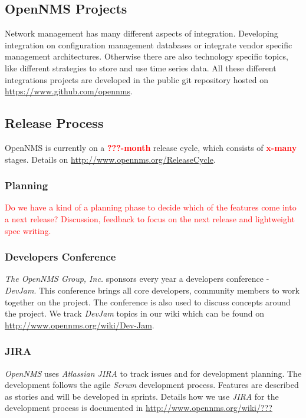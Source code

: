 \subsection{OpenNMS Projects}
Network management has many different aspects of integration. Developing integration on configuration management databases or integrate vendor specific management architectures. Otherwise there are also technology specific topics, like different strategies to store and use time series data. All these different integrations projects are developed in the public git repository hosted on \url{https://www.github.com/opennms}.

\subsection{Release Process}
OpenNMS is currently on a \textbf{\textcolor{red}{???-month}} release cycle, which consists of \textbf{\textcolor{red}{x-many}} stages. Details on \textcolor{red}{\url{http://www.opennms.org/ReleaseCycle}}.

\subsubsection{Planning}
\textcolor{red}{Do we have a kind of a planning phase to decide which of the features come into a next release? Discussion, feedback to focus on the next release and lightweight spec writing.}

\subsubsection{Developers Conference}
\emph{The OpenNMS Group, Inc.} sponsors every year a developers conference - \emph{DevJam}. This conference brings all core developers, community members to work together on the project. The conference is also used to discuss concepts around the project. We track \emph{DevJam} topics in our wiki which can be found on \url{http://www.opennms.org/wiki/Dev-Jam}.

\subsubsection{JIRA}
\emph{OpenNMS} uses \emph{Atlassian JIRA} to track issues and for development planning. The development follows the agile \emph{Scrum} development process. Features are described as stories and will be developed in sprints. Details how we use \emph{JIRA} for the development process is documented in \textcolor{red}{\url{http://www.opennms.org/wiki/???}}

